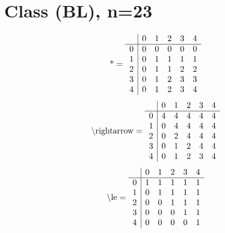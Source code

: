 \documentclass[11pt]{article}
\begin{document}
\section{Class (BL), n=23}
\[\text{*} = 
\begin{array}{r | r r r r r}
 & 0 & 1 & 2 & 3 & 4 \\ \hline
0 & 0 & 0 & 0 & 0 & 0 \\
1 & 0 & 1 & 1 & 1 & 1 \\
2 & 0 & 1 & 1 & 2 & 2 \\
3 & 0 & 1 & 2 & 3 & 3 \\
4 & 0 & 1 & 2 & 3 & 4 \\
\end{array}
\]
\[\text{\textbackslash rightarrow} = 
\begin{array}{r | r r r r r}
 & 0 & 1 & 2 & 3 & 4 \\ \hline
0 & 4 & 4 & 4 & 4 & 4 \\
1 & 0 & 4 & 4 & 4 & 4 \\
2 & 0 & 2 & 4 & 4 & 4 \\
3 & 0 & 1 & 2 & 4 & 4 \\
4 & 0 & 1 & 2 & 3 & 4 \\
\end{array}
\]
\[\text{\textbackslash le} = 
\begin{array}{r | r r r r r}
 & 0 & 1 & 2 & 3 & 4 \\ \hline
0 & 1 & 1 & 1 & 1 & 1 \\
1 & 0 & 1 & 1 & 1 & 1 \\
2 & 0 & 0 & 1 & 1 & 1 \\
3 & 0 & 0 & 0 & 1 & 1 \\
4 & 0 & 0 & 0 & 0 & 1 \\
\end{array}
\]
\end{document}
